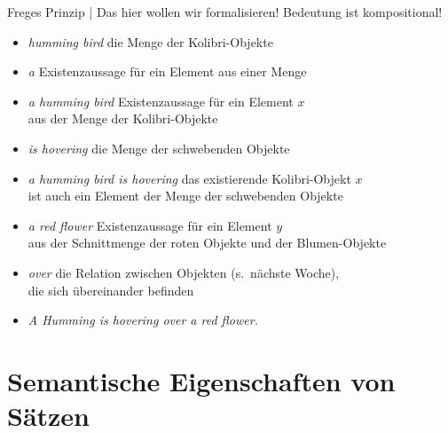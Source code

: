 \begin{frame}
  {Freges Prinzip | Das hier wollen wir formalisieren!}
  \onslide<+->
  \onslide<+->
  Bedeutung ist kompositional!\\
  \Halbzeile
  \begin{itemize}[<+->]\small
    \item \textit{humming bird}  die \alert{Menge} der Kolibri-Objekte
    \item \textit{a}  \alert{Existenzaussage} für ein Element aus einer Menge
    \item \textit{a humming bird}  \alert{Existenzaussage} für ein Element $x$\\
      aus der Menge der Kolibri-Objekte
    \item \textit{is hovering}  die \alert{Menge} der schwebenden Objekte
    \item \textit{a humming bird is hovering}  das existierende Kolibri-Objekt $x$\\
      ist auch ein \alert{Element der Menge} der schwebenden Objekte
    \item \textit{a red flower}  \alert{Existenzaussage} für ein Element $y$\\
      aus der \alert{Schnittmenge} der roten Objekte und der Blumen-Objekte
    \item \textit{over}  die \alert{Relation} zwischen Objekten (s.\ nächste Woche),\\
      die sich übereinander befinden
    \item \textit{A Humming is hovering over a red flower.} \\
  \end{itemize}
\end{frame}

\section{Semantische Eigenschaften von Sätzen}

